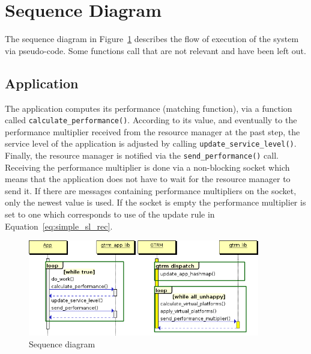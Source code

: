\documentclass[nobiblatex]{LTHthesis}
\begin{document}
\section{Sequence Diagram}

The sequence diagram in Figure~\ref{fig:sdiag} describes the flow of 
execution of the system via pseudo-code. Some functions call that are 
not relevant and have been left out. 
\subsection{Application}
The application computes its performance (matching function), via a 
function called \texttt{calculate\_performance()}. According to its value,
and eventually to the performance multiplier received from the resource
manager at the past step, the service level of the application is adjusted by
calling \texttt{update\_service\_level()}. Finally, the resource manager
is notified via the \texttt{send\_performance()} call. 
Receiving the performance multiplier is done via a non-blocking socket which
means that the application does not have to wait for the resource manager to 
send it. If there are messages containing performance multipliers on the 
socket, only the newest value is used. If the socket is
empty the performance multiplier is set to one which corresponds to use of the 
update rule in Equation~\ref{eq:simple_sl_rec}.

\begin{figure}[t]
    \centering
    \includegraphics[width=0.9\textwidth]{diag.png}
    \caption{Sequence diagram}
    \label{fig:sdiag}
\end{figure}
\end{document}
